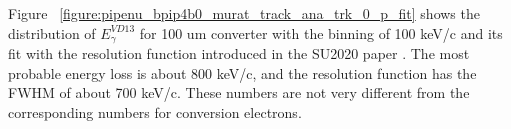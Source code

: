 Figure ~\ref{figure:pipenu_bpip4b0_murat_track_ana_trk_0_p_fit} shows the distribution of $E_\gamma^{VD13}$
for 100 um converter with the binning of 100 keV/c and its fit with the resolution function introduced
in the SU2020 paper \cite{SU2020_PAPER}. The most probable energy loss is about 800 keV/c, 
and the resolution function has the FWHM of about 700 keV/c.
These numbers are not very different from the corresponding numbers for conversion electrons.

